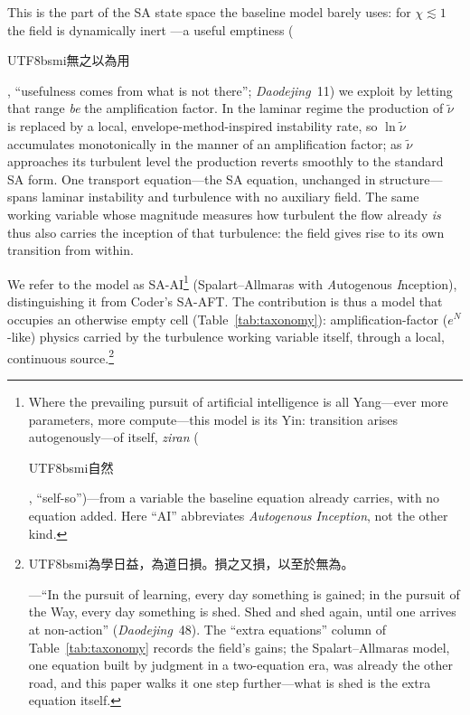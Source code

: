 \documentclass[journal]{new-aiaa}
\begin{document}
This is the part of the SA state space the baseline model barely uses:
for $\chi\!\lesssim\!1$ the field is dynamically
inert \cite{spalart_allmaras_1994}---a useful emptiness
(\begin{CJK}{UTF8}{bsmi}無之以為用\end{CJK}, ``usefulness comes from what is
not there''; \emph{Daodejing}~11) we exploit by
letting that range \emph{be} the
amplification factor. In the laminar regime the production of $\tilde\nu$ is replaced by a local,
envelope-method-inspired instability rate, so $\ln\tilde\nu$ accumulates
monotonically in the manner of an amplification factor; as $\tilde\nu$ approaches its
turbulent level the production reverts smoothly to the standard SA form. One
transport equation---the SA equation, unchanged in structure---spans laminar
instability and turbulence with no auxiliary field. The same working variable
whose magnitude measures how turbulent the flow already \emph{is} thus also
carries the inception of that turbulence: the field gives rise to its own
transition from within.

We refer to the model as SA-AI\footnote{Where the prevailing pursuit of
artificial intelligence is all Yang---ever more parameters, more compute---this
model is its Yin: transition arises autogenously---of itself,
\emph{ziran} (\begin{CJK}{UTF8}{bsmi}自然\end{CJK}, ``self-so'')---from a
variable the baseline
equation already carries, with no equation added. Here ``AI'' abbreviates
\emph{Autogenous Inception}, not the other kind.} (Spalart--Allmaras with
\emph{A}utogenous \emph{I}nception), distinguishing it from Coder's
SA-AFT. The contribution is thus a
model that occupies an otherwise empty cell
(Table~\ref{tab:taxonomy}): amplification-factor ($e^N$-like) physics carried by the
turbulence working variable itself, through a local, continuous
source.\footnote{\begin{CJK}{UTF8}{bsmi}為學日益，為道日損。損之又損，以至於無為。\end{CJK}---``In
the pursuit of learning, every day something is gained; in the pursuit of the
Way, every day something is shed. Shed and shed again, until one arrives at
non-action'' (\emph{Daodejing}~48). The ``extra equations'' column of
Table~\ref{tab:taxonomy} records the field's gains; the Spalart--Allmaras
model, one equation built by judgment in a two-equation era, was already the
other road, and this paper walks it one step further---what is shed is the
extra equation itself.}
\end{document}
